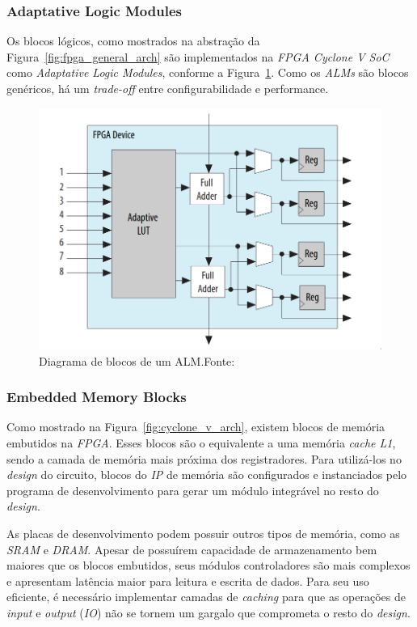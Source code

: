         \subsubsection{Adaptative Logic Modules}
        { Os blocos lógicos, como mostrados na abstração da Figura~\ref{fig:fpga_general_arch}
            são implementados na \textit{FPGA Cyclone V SoC} como
            \textit{Adaptative Logic Modules}, conforme a Figura~\ref{fig:fpga_alm}.
            Como os \textit{ALMs} são blocos genéricos, há um \textit{trade-off}
            entre configurabilidade e performance.
        }

        \begin{figure}[H]
        \centering
        \includegraphics[width=.7\linewidth]
            {../images/intel_alm_high_level.png}
            \caption[Diagrama de blocos de um ALM]
                {Diagrama de blocos de um ALM.\quad Fonte:~\cite{cyclone_alm}}
            \label{fig:fpga_alm}
        \end{figure}


        \subsubsection{Embedded Memory Blocks}
        { Como mostrado na Figura~\ref{fig:cyclone_v_arch}, existem blocos de
            memória embutidos na \textit{FPGA}. Esses blocos são o equivalente
            a uma memória \textit{cache L1}, sendo a camada de memória mais próxima
            dos registradores. Para utilizá-los no \textit{design} do circuito,
            blocos do \textit{IP} de memória são configurados e instanciados
            pelo programa de desenvolvimento para gerar um módulo integrável no
            resto do \textit{design}.
        }

        { As placas de desenvolvimento podem possuir outros tipos de memória,
            como as \textit{SRAM} e \textit{DRAM}. Apesar de possuírem capacidade
            de armazenamento bem maiores que os blocos embutidos, seus
            módulos controladores são mais complexos e apresentam latência maior
            para leitura e escrita de dados. Para seu uso eficiente, é necessário
            implementar camadas de \textit{caching} para que as operações de
            \textit{input} e \textit{output} (\textit{IO}) não se tornem um
            gargalo que comprometa o resto do \textit{design}.
        }


